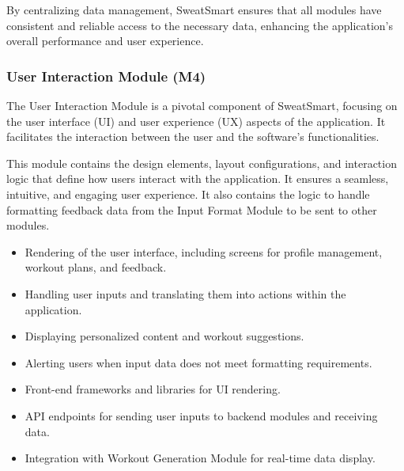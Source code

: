 \documentclass[12pt, titlepage]{article}
\begin{document}
By centralizing data management, SweatSmart ensures that all modules have consistent and reliable access to the necessary data, enhancing the application's overall performance and user experience.

\subsubsection{User Interaction Module (M4)}

The User Interaction Module is a pivotal component of SweatSmart, focusing on the user interface (UI) and user experience (UX) aspects of the application. It facilitates the interaction between the user and the software's functionalities.

\begin{description}[leftmargin=0pt]
\item[Secrets:] 
This module contains the design elements, layout configurations, and interaction logic that define how users interact with the application. It ensures a seamless, intuitive, and engaging user experience. It also contains the logic to handle formatting feedback data from the Input Format Module to be sent to other modules.
\end{description}

\begin{description}[leftmargin=0pt]
\item[Services:] 
\end{description}
\begin{itemize}[leftmargin=*]
\item Rendering of the user interface, including screens for profile management, workout plans, and feedback.
\item Handling user inputs and translating them into actions within the application.
\item Displaying personalized content and workout suggestions.
\item Alerting users when input data does not meet formatting requirements.
\end{itemize}

\begin{description}[leftmargin=0pt]
\item[Interfaces:] 
\end{description}
\begin{itemize}[leftmargin=*]
\item Front-end frameworks and libraries for UI rendering.
\item API endpoints for sending user inputs to backend modules and receiving data.
\item Integration with Workout Generation Module for real-time data display.
\end{itemize}
\end{document}
